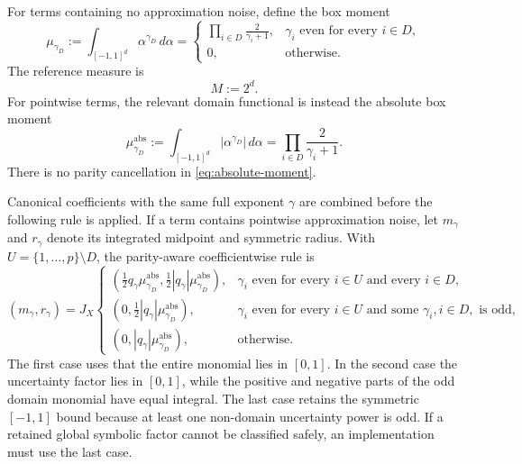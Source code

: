 \documentclass[11pt]{article}
\newcommand{\abs}[1]{\left\lvert #1\right\rvert}
\begin{document}
For terms containing no approximation noise, define the box moment
\begin{equation}
    \mu_{\gamma_D}
    :=
    \int_{[-1,1]^d}\alpha^{\gamma_D}\,d\alpha
    =
    \begin{cases}
    \displaystyle
    \prod_{i\in D}\frac{2}{\gamma_i+1},
        &\gamma_i\text{ even for every }i\in D,\\[3mm]
    0,&\text{otherwise}.
    \end{cases}
    \label{eq:moment}
\end{equation}
The reference measure is
\[
    M:=2^d.
\]
For pointwise terms, the relevant domain functional is instead the absolute
box moment
\begin{equation}
    \mu^{\mathrm{abs}}_{\gamma_D}
    :=
    \int_{[-1,1]^d}\abs{\alpha^{\gamma_D}}\,d\alpha
    =
    \prod_{i\in D}\frac{2}{\gamma_i+1}.
    \label{eq:absolute-moment}
\end{equation}
There is no parity cancellation in \eqref{eq:absolute-moment}.

Canonical coefficients with the same full exponent \(\gamma\) are combined
before the following rule is applied.  If a term contains pointwise
approximation noise, let \(m_\gamma\) and \(r_\gamma\) denote its integrated
midpoint and symmetric radius.  With \(U=\{1,\ldots,p\}\setminus D\), the
parity-aware coefficientwise rule is
\begin{equation}
 (m_\gamma,r_\gamma)
 =J_X\begin{cases}
 \left(\frac12q_\gamma\mu^{\mathrm{abs}}_{\gamma_D},
       \frac12\abs{q_\gamma}\mu^{\mathrm{abs}}_{\gamma_D}\right),
 &\gamma_i\text{ even for every }i\in U
  \text{ and every }i\in D,\\[2mm]
 \left(0,
       \frac12\abs{q_\gamma}\mu^{\mathrm{abs}}_{\gamma_D}\right),
 &\gamma_i\text{ even for every }i\in U
  \text{ and some }\gamma_i, i\in D,\text{ is odd},\\[2mm]
 \left(0,
       \abs{q_\gamma}\mu^{\mathrm{abs}}_{\gamma_D}\right),
 &\text{otherwise}.
 \end{cases}
 \label{eq:pointwise-parity-rule}
\end{equation}
The first case uses that the entire monomial lies in \([0,1]\).  In the
second case the uncertainty factor lies in \([0,1]\), while the positive and
negative parts of the odd domain monomial have equal integral.  The last case
retains the symmetric \([-1,1]\) bound because at least one non-domain
uncertainty power is odd.  If a retained global symbolic factor cannot be
classified safely, an implementation must use the last case.
\end{document}
